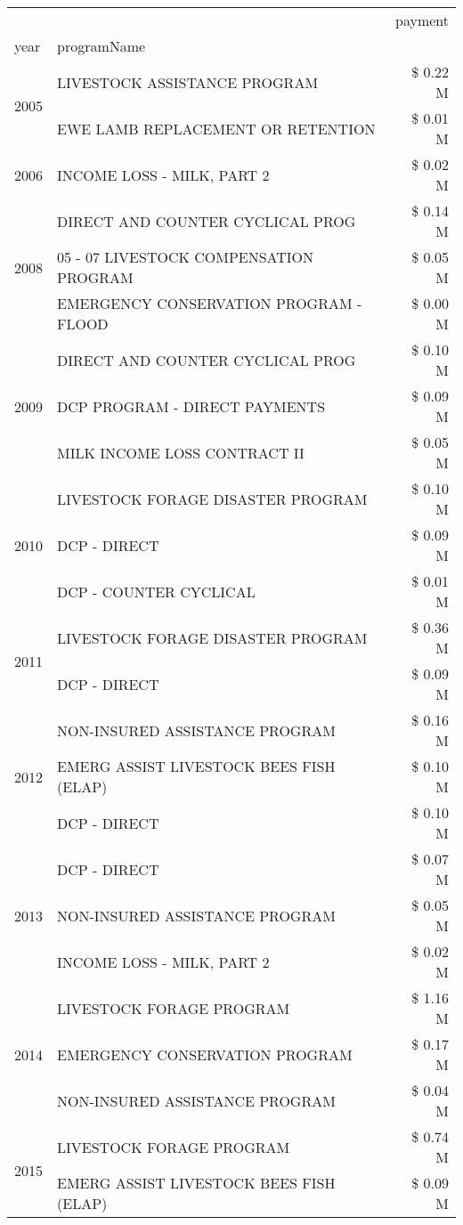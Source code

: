 \begin{tabular}{llr}
\toprule
 &  & payment \\
year & programName &  \\
\midrule
\multirow[t]{2}{*}{2005} & LIVESTOCK ASSISTANCE PROGRAM & \$ 0.22 M \\
 & EWE LAMB REPLACEMENT OR RETENTION & \$ 0.01 M \\
\cline{1-3}
2006 & INCOME LOSS - MILK, PART 2 & \$ 0.02 M \\
\cline{1-3}
\multirow[t]{3}{*}{2008} & DIRECT AND COUNTER CYCLICAL PROG & \$ 0.14 M \\
 & 05 - 07 LIVESTOCK COMPENSATION PROGRAM & \$ 0.05 M \\
 & EMERGENCY CONSERVATION PROGRAM - FLOOD & \$ 0.00 M \\
\cline{1-3}
\multirow[t]{3}{*}{2009} & DIRECT AND COUNTER CYCLICAL PROG & \$ 0.10 M \\
 & DCP PROGRAM - DIRECT PAYMENTS & \$ 0.09 M \\
 & MILK INCOME LOSS CONTRACT II & \$ 0.05 M \\
\cline{1-3}
\multirow[t]{3}{*}{2010} & LIVESTOCK FORAGE DISASTER PROGRAM & \$ 0.10 M \\
 & DCP - DIRECT & \$ 0.09 M \\
 & DCP - COUNTER CYCLICAL & \$ 0.01 M \\
\cline{1-3}
\multirow[t]{2}{*}{2011} & LIVESTOCK FORAGE DISASTER PROGRAM & \$ 0.36 M \\
 & DCP - DIRECT & \$ 0.09 M \\
\cline{1-3}
\multirow[t]{3}{*}{2012} & NON-INSURED ASSISTANCE PROGRAM & \$ 0.16 M \\
 & EMERG ASSIST LIVESTOCK BEES FISH (ELAP) & \$ 0.10 M \\
 & DCP - DIRECT & \$ 0.10 M \\
\cline{1-3}
\multirow[t]{3}{*}{2013} & DCP - DIRECT & \$ 0.07 M \\
 & NON-INSURED ASSISTANCE PROGRAM & \$ 0.05 M \\
 & INCOME LOSS - MILK, PART 2 & \$ 0.02 M \\
\cline{1-3}
\multirow[t]{3}{*}{2014} & LIVESTOCK FORAGE PROGRAM & \$ 1.16 M \\
 & EMERGENCY CONSERVATION PROGRAM & \$ 0.17 M \\
 & NON-INSURED ASSISTANCE PROGRAM & \$ 0.04 M \\
\cline{1-3}
\multirow[t]{2}{*}{2015} & LIVESTOCK FORAGE PROGRAM & \$ 0.74 M \\
 & EMERG ASSIST LIVESTOCK BEES FISH (ELAP) & \$ 0.09 M \\

\end{tabular}
